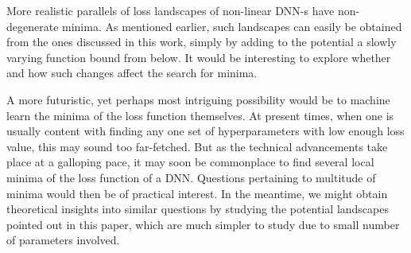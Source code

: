 \documentclass[12pt,a4paper]{JHEP3}
\begin{document}
More realistic parallels of loss landscapes of non-linear DNN-s have non-degenerate minima. As mentioned earlier, such landscapes can easily be obtained from the ones discussed in this work, simply by adding to the potential a slowly varying function bound from below.  It would be interesting to explore  whether and how such changes affect the search for minima.

A more futuristic, yet perhaps most intriguing possibility would be to machine learn the minima of the loss function themselves. At present times, when one is usually content with finding any one set of hyperparameters with low enough loss value, this may sound too far-fetched. But as the technical advancements take place at a  galloping pace, it may soon be commonplace to find several local minima of the loss function of a DNN. Questions pertaining to multitude of minima would then be of practical interest. In the meantime, we might obtain theoretical insights into similar questions by studying the potential landscapes pointed out in this paper, which are much simpler to study due to small number of parameters involved.
\end{document}
